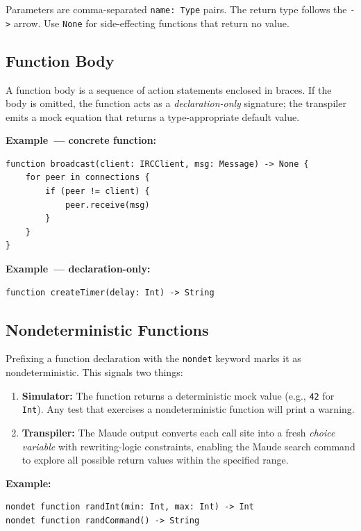 \documentclass[11pt,letterpaper]{article}
\begin{document}
Parameters are comma-separated \texttt{name: Type} pairs.  The return
type follows the \lstinline{->} arrow.  Use \texttt{None} for
side-effecting functions that return no value.

\subsection{Function Body}

A function body is a sequence of action statements enclosed in braces.
If the body is omitted, the function acts as a \emph{declaration-only}
signature; the transpiler emits a mock equation that returns a
type-appropriate default value.

\textbf{Example~--- concrete function:}
\begin{lstlisting}
function broadcast(client: IRCClient, msg: Message) -> None {
    for peer in connections {
        if (peer != client) {
            peer.receive(msg)
        }
    }
}
\end{lstlisting}

\textbf{Example~--- declaration-only:}
\begin{lstlisting}[numbers=none]
function createTimer(delay: Int) -> String
\end{lstlisting}

\subsection{Nondeterministic Functions}
\label{sec:nondet}

Prefixing a function declaration with the \lstinline{nondet} keyword marks
it as nondeterministic.  This signals two things:

\begin{enumerate}
  \item \textbf{Simulator:}  The function returns a deterministic mock
        value (e.g., \texttt{42} for \texttt{Int}).  Any test that
        exercises a nondeterministic function will print a warning.
  \item \textbf{Transpiler:}  The Maude output converts each call site
        into a fresh \emph{choice variable} with rewriting-logic
        constraints, enabling the Maude search command to explore all
        possible return values within the specified range.
\end{enumerate}

\textbf{Example:}
\begin{lstlisting}[numbers=none]
nondet function randInt(min: Int, max: Int) -> Int
nondet function randCommand() -> String
\end{lstlisting}
\end{document}

